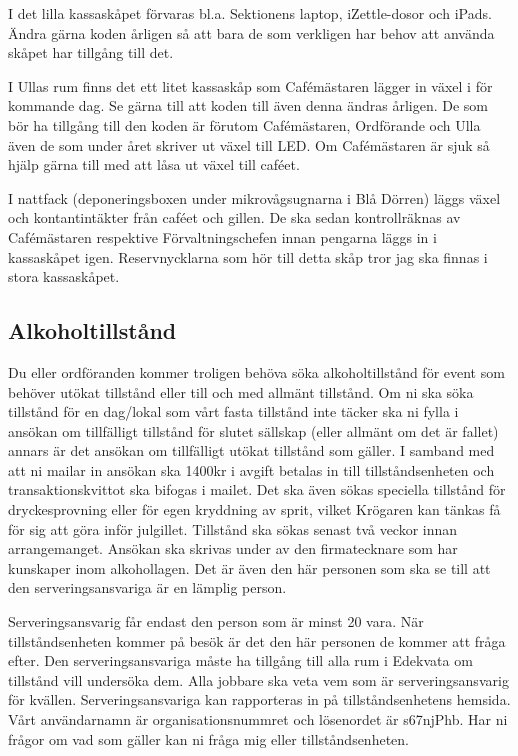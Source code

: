 \documentclass[10pt]{article}
\begin{document}
I det lilla kassaskåpet förvaras bl.a. Sektionens laptop, iZettle-dosor och iPads. Ändra gärna koden årligen så att bara de som verkligen har behov att använda skåpet har tillgång till det.

I Ullas rum finns det ett litet kassaskåp som Cafémästaren lägger in växel i för kommande dag. Se gärna till att koden till även denna ändras årligen. De som bör ha tillgång till den koden är förutom Cafémästaren, Ordförande och Ulla även de som under året skriver ut växel till LED. Om Cafémästaren är sjuk så hjälp gärna till med att låsa ut växel till caféet.

I nattfack (deponeringsboxen under mikrovågsugnarna i Blå Dörren) läggs växel och kontantintäkter från caféet och gillen. De ska sedan kontrollräknas av Cafémästaren respektive Förvaltningschefen innan pengarna läggs in i kassaskåpet igen. Reservnycklarna som hör till detta skåp tror jag ska finnas i stora kassaskåpet.

\subsection{Alkoholtillstånd}
Du eller ordföranden kommer troligen behöva söka alkoholtillstånd för event som behöver utökat tillstånd eller till och med allmänt tillstånd. Om ni ska söka tillstånd för en dag/lokal som vårt fasta tillstånd inte täcker ska ni fylla i ansökan om tillfälligt tillstånd för slutet sällskap (eller allmänt om det är fallet) annars är det ansökan om tillfälligt utökat tillstånd som gäller.
I samband med att ni mailar in ansökan ska 1400kr i avgift betalas in till tillståndsenheten och transaktionskvittot ska bifogas i mailet. Det ska även sökas speciella tillstånd för dryckesprovning eller för egen kryddning av sprit, vilket Krögaren kan tänkas få för sig att göra inför julgillet. Tillstånd ska sökas senast två veckor innan arrangemanget. Ansökan ska skrivas under av den firmatecknare som har kunskaper inom alkohollagen. Det är även den här personen som ska se till att den serveringsansvariga är en lämplig person.

Serveringsansvarig får endast den person som är minst 20 vara. När tillståndsenheten kommer på besök är det den här personen de kommer att fråga efter. Den serveringsansvariga måste ha tillgång till alla rum i Edekvata om tillstånd vill undersöka dem. Alla jobbare ska veta vem som är serveringsansvarig för kvällen. Serveringsansvariga kan rapporteras in på tillståndsenhetens hemsida. Vårt användarnamn är organisationsnummret och lösenordet är s67njPhb.  Har ni frågor om vad som gäller kan ni fråga mig eller tillståndsenheten.
\end{document}
